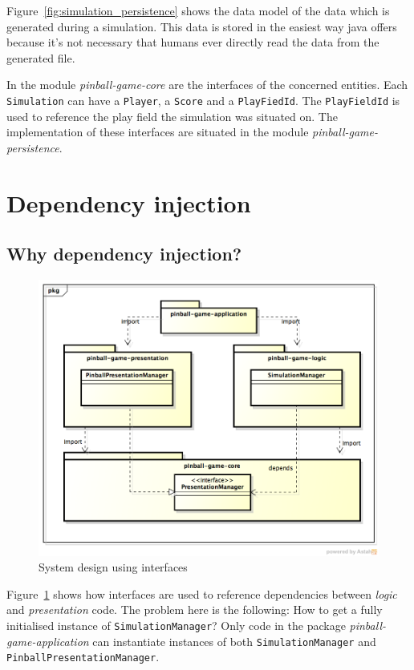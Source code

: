 \documentclass[fontsize=12pt,
               paper=a4,
               twoside=false,
               parskip=half,
               ]{scrartcl}
\begin{document}
Figure~\ref{fig:simulation_persistence} shows the data model of the data which is generated during a simulation. This data is stored in the easiest way java offers because it's not necessary that humans ever directly read the data from the generated file.

In the module \emph{pinball-game-core} are the interfaces of the concerned entities. Each \texttt{Simulation} can have a \texttt{Player}, a \texttt{Score} and a \texttt{PlayFiedId}. The \texttt{PlayFieldId} is used to reference the play field the simulation was situated on. The implementation of these interfaces are situated in the module \emph{pinball-game-persistence}.


\section{Dependency injection}

\subsection{Why dependency injection?}

\begin{figure}[H]
	\centering
	\includegraphics[width=15.5cm]{./img/dependency-injection1.png}
	\caption[System design]{System design using interfaces}
	\label{fig:dependency_injection1}
\end{figure}

Figure~\ref{fig:dependency_injection1} shows how interfaces are used to reference dependencies between \emph{logic} and \emph{presentation} code. The problem here is the following: How to get a fully initialised instance of \texttt{SimulationManager}? Only code in the package \emph{pinball-game-application} can instantiate instances of both \texttt{SimulationManager} and \texttt{PinballPresentationManager}.
\end{document}
